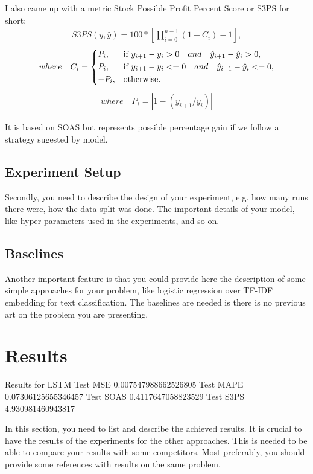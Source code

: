 \documentclass{article}
\begin{document}
I also came up with a metric Stock Possible Profit Percent Score or S3PS for short:
\begin{align}
S3PS(y, \hat{y}) = 100 * [\prod_{i=0}^{n-1}{(1 + C_i)} - 1],
\end{align}
\begin{align}
where \quad C_i = \begin{dcases*}
        P_i, & if $ y_{i+1} - y_{i} > 0  \quad and \quad \hat{y}_{i+1} - \hat{y}_{i} > 0 $,\\
        P_i, & if $ y_{i+1} - y_{i} <= 0  \quad and \quad \hat{y}_{i+1} - \hat{y}_{i} <= 0 $,\\
        -P_i, & otherwise. 
        \end{dcases*} \nonumber 
\end{align}
\begin{align}
where \quad P_i = \left| 1 - (y_{i+1}/y_{i}) \right| \nonumber 
\end{align}

It is based on SOAS but represents possible percentage gain if we follow a strategy sugested by model.


\subsection{Experiment Setup}
Secondly, you need to describe the design of your experiment, e.g. how many runs there were, how the data split was done. The important details of your model, like hyper-parameters used in the experiments, and so on.

\subsection{Baselines}
Another important feature is that you could provide here the description of some simple approaches for your problem, like logistic regression over TF-IDF embedding for text classification. The baselines are needed is there is no previous art on the problem you are presenting.

\section{Results}
\label{sec:results}

Results for LSTM
Test MSE 0.007547988662526805
Test MAPE 0.07306125655346457
Test SOAS 0.4117647058823529
Test S3PS 4.930981460943817


In this section, you need to list and describe the achieved results. It is crucial to have the results of the experiments for the other approaches. This is needed to be able to compare your results with some competitors. Most preferably, you should provide some references with results on the same problem.
\end{document}
